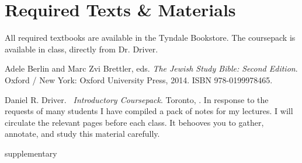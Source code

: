 \documentclass[titlepage]{article}
\newcommand\incl{../includes}
\begin{document}


\section{Required Texts \& Materials}
\label{texts}

All required textbooks are available in the Tyndale Bookstore. The
coursepack is available in class, directly from Dr. Driver.

\begingroup
\renewcommand{\section}[2]{}%
\begin{thebibliography}{Heschel}%

	Adele Berlin and Marc Zvi Brettler, eds.
    \emph{The Jewish Study Bible: Second Edition}.
    Oxford / New York: Oxford University Press, 2014.
    ISBN 978-0199978465.


	 Daniel R. Driver. \emph{\ctitle\ Introductory
	Coursepack}. Toronto, \csemester. In response to the requests of
	many students I have compiled a pack of notes for my lectures. I
	will circulate the relevant pages before each class. It behooves you
	to gather, annotate, and study this material carefully.

\end{thebibliography}
\endgroup

\section{Supplementary Texts}
\label{supplementary}
\end{document}
